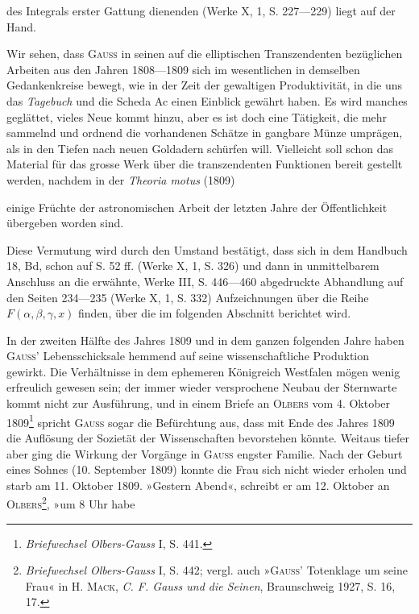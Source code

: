 des Integrals erster Gattung dienenden (Werke X, 1, S. 227—229)
liegt auf der Hand.
\par
Wir sehen, dass \textsc{Gauss} in seinen auf die elliptischen Transzendenten bezüglichen
Arbeiten aus den Jahren 1808—1809 sich im wesentlichen in demselben
Gedankenkreise bewegt, wie in der Zeit der gewaltigen Produktivität,
in die uns das \textit{Tagebuch} und die Scheda Ac einen Einblick gewährt haben.
Es wird manches geglättet, vieles Neue kommt hinzu, aber es ist doch eine
Tätigkeit, die mehr sammelnd und ordnend die vorhandenen Schätze in gangbare
Münze umprägen, als in den Tiefen nach neuen Goldadern schürfen will.
Vielleicht soll schon das Material für das grosse Werk über die transzendenten
Funktionen bereit gestellt werden, nachdem in der \textit{Theoria motus} (1809)\par
\clearpage{}
\noindent einige Früchte der astronomischen Arbeit der letzten Jahre der Öffentlichkeit
übergeben worden sind.
\par
Diese Vermutung wird durch den Umstand bestätigt, dass sich in dem
Handbuch 18, Bd, schon auf S. 52 ff. (Werke X, 1, S. 326) und dann in unmittelbarem
Anschluss an die erwähnte, Werke III, S. 446—460 abgedruckte
Abhandlung auf den Seiten 234—235 (Werke X, 1, S. 332) Aufzeichnungen
über die Reihe \(F(\alpha,\beta,\gamma,x)\) finden, über die im folgenden Abschnitt berichtet
wird.
\par
In der zweiten Hälfte des Jahres 1809 und in dem ganzen folgenden
Jahre haben \textsc{Gauss}' Lebensschicksale hemmend auf seine wissenschaftliche
Produktion gewirkt. Die Verhältnisse in dem ephemeren Königreich Westfalen
mögen wenig erfreulich gewesen sein; der immer wieder versprochene
Neubau der Sternwarte kommt nicht zur Ausführung, und in einem Briefe an
\textsc{Olbers} vom 4. Oktober 1809\footnote{\textit{Briefwechsel Olbers-Gauss} I, S. 441.} spricht \textsc{Gauss} sogar die Befürchtung aus, dass
mit Ende des Jahres 1809 die Auflösung der Sozietät der Wissenschaften
bevorstehen könnte. Weitaus tiefer aber ging die Wirkung der Vorgänge in
\textsc{Gauss} engster Familie. Nach der Geburt eines Sohnes (10. September 1809)
konnte die Frau sich nicht wieder erholen und starb am 11. Oktober 1809.
»Gestern Abend«, schreibt er am 12. Oktober an \textsc{Olbers}\footnote{\textit{Briefwechsel Olbers-Gauss} I, S. 442; vergl. auch »\textsc{Gauss}' Totenklage um seine Frau« in H. \textsc{Mack}, \textit{C. F. Gauss und die Seinen}, Braunschweig 1927, S. 16, 17.}, »um 8 Uhr habe
